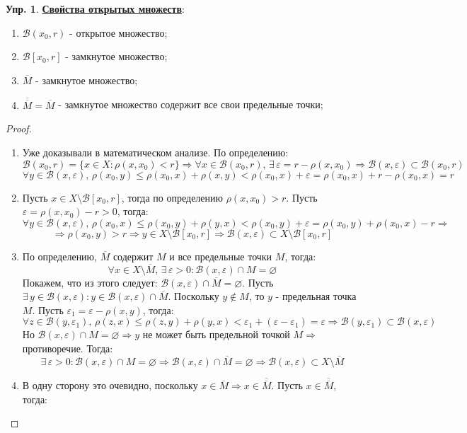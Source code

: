 \documentclass[12pt]{article}
\newcommand{\MB}{\mathcal{B}}
\newcommand{\VN}{\varnothing}
\newcommand{\VE}{\varepsilon}
\theoremstyle{definition}
\newtheorem{exrc}{Упр.}
\newcommand{\ovl}[1]{\overline{#1}}
\begin{document}
\begin{exrc}\textbf{\uline{Свойства открытых множеств}}:
	\begin{enumerate}[label=\arabic*)]
		\item $\MB(x_0, r)$ - открытое множество;
		\item $\MB[x_0,r]$ - замкнутое множество;
		\item $\ovl{M}$ - замкнутое множество;
		\item $\ovl{\ovl{M}} = \ovl{M}$ - замкнутое множество содержит все свои предельные точки;
	\end{enumerate}
\end{exrc}
\begin{proof}\hfill
	\begin{enumerate}[label=\arabic*)]
		\item Уже доказывали в математическом анализе. По определению:
		$$
			\MB(x_0,r) = \{x \in X \colon \rho(x,x_0) < r\} \Rightarrow \forall x \in \MB(x_0,r), \, \exists \, \VE = r - \rho(x,x_0) \Rightarrow \MB(x,\VE) \subset \MB(x_0,r)
		$$
		$$
			\forall y \in \MB(x,\VE), \, \rho(x_0,y) \leq \rho(x_0, x) + \rho(x,y) < \rho(x_0,x) + \VE = \rho(x_0,x) + r - \rho(x_0,x) = r
		$$
		\item Пусть $x \in X\setminus\MB[x_0,r]$, тогда по определению $\rho(x,x_0) > r$. Пусть $\VE = \rho(x,x_0) - r > 0$, тогда:
		$$
			\forall y \in \MB(x,\VE), \, \rho(x_0,x) \leq \rho(x_0,y) + \rho(y,x) < \rho(x_0,y) + \VE = \rho(x_0,y) + \rho(x_0,x) - r \Rightarrow
		$$
		$$
			\Rightarrow \rho(x_0, y) > r \Rightarrow y \in X \setminus \MB[x_0,r] \Rightarrow \MB(x,\VE)\subset X\setminus \MB[x_0,r]
		$$
		\item По определению, $\ovl{M}$ содержит $M$ и все предельные точки $M$, тогда: 
		$$
			\forall x \in X\setminus \ovl{M}, \, \exists \, \VE > 0 \colon \MB(x,\VE) \cap M = \VN  
		$$ 
		Покажем, что из этого следует: $\MB(x,\VE) \cap \ovl{M} = \VN$. Пусть $\exists \, y \in \MB(x,\VE) \colon y \in \MB(x,\VE) \cap \ovl{M}$. Поскольку $y \not\in M$, то $y$ - предельная точка $M$. Пусть $\VE_1 = \VE - \rho(x,y)$, тогда:
		$$
			\forall z \in \MB(y,\VE_1), \, \rho(z,x) \leq \rho(z,y) + \rho(y,x) < \VE_1 + (\VE - \VE_1) = \VE \Rightarrow \MB(y,\VE_1) \subset \MB(x,\VE)
		$$
		Но $\MB(x,\VE) \cap M = \VN \Rightarrow y$ не может быть предельной точкой $M \Rightarrow$ противоречие. Тогда:
		$$
			\exists \, \VE > 0 \colon \MB(x,\VE) \cap M = \VN  \Rightarrow \MB(x,\VE) \cap \ovl{M} = \VN \Rightarrow \MB(x,\VE) \subset X \setminus \ovl{M}
		$$
		\item В одну сторону это очевидно, поскольку $x \in \ovl{M} \Rightarrow x \in \ovl{\ovl{M}}$. Пусть $x \in \ovl{\ovl{M}}$, тогда:

\end{enumerate}
\end{proof}
\end{document}
